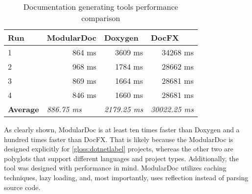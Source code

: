 \begin{table}[H]
    \centering
    \label{tab:toolPerformance}
    \begin{tabular}{lrrr}
    \hline
    \textbf{Run}            & \multicolumn{1}{l}{\textbf{ModularDoc}}    & \multicolumn{1}{l}{\textbf{Doxygen}}    & \multicolumn{1}{l}{\textbf{DocFX}}       \\ \hline
    \multicolumn{1}{|l|}{1} & \multicolumn{1}{r|}{864 ms}            & \multicolumn{1}{r|}{3609 ms}            & \multicolumn{1}{r|}{34268 ms}            \\ \hline
    \multicolumn{1}{|l|}{2} & \multicolumn{1}{r|}{968 ms}            & \multicolumn{1}{r|}{1784 ms}            & \multicolumn{1}{r|}{28662 ms}            \\ \hline
    \multicolumn{1}{|l|}{3} & \multicolumn{1}{r|}{869 ms}            & \multicolumn{1}{r|}{1664 ms}            & \multicolumn{1}{r|}{28681 ms}            \\ \hline
    \multicolumn{1}{|l|}{4} & \multicolumn{1}{r|}{846 ms}            & \multicolumn{1}{r|}{1660 ms}            & \multicolumn{1}{r|}{28681 ms}            \\ \hline
    \textbf{Average}        & \multicolumn{1}{l}{\textit{886.75 ms}} & \multicolumn{1}{l}{\textit{2179.25 ms}} & \multicolumn{1}{l}{\textit{30022.25 ms}} \\ \hline
    \end{tabular}
    \caption{Documentation generating tools performance comparison}
\end{table}

As clearly shown, ModularDoc is at least ten times faster than Doxygen and a hundred times faster than DocFX.
That is likely because the ModularDoc is designed explicitly for \ref{gloss:dotnetlabel} projects, whereas the other two are polyglots that support different languages and project types.
Additionally, the tool was designed with performance in mind. ModularDoc utilizes caching techniques, lazy loading, and, most importantly, uses reflection instead of parsing source code.